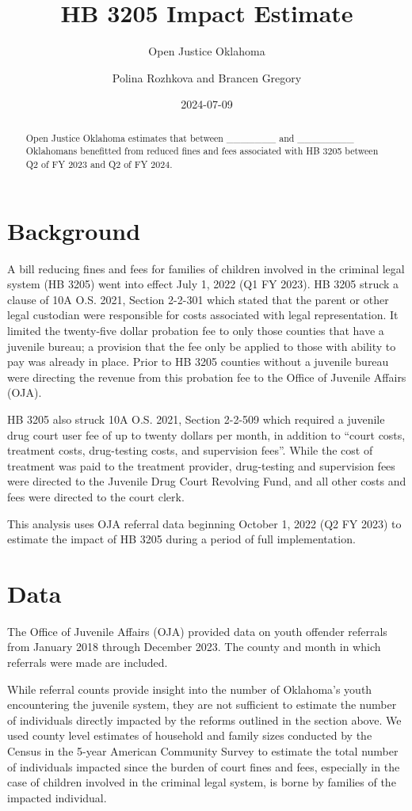 \documentclass[
  letterpaper,
  DIV=11,
  numbers=noendperiod]{scrartcl}
\title{HB 3205 Impact Estimate}
\subtitle{Open Justice Oklahoma}
\author{Polina Rozhkova and Brancen Gregory}
\date{2024-07-09}
\begin{document}
\maketitle
\begin{abstract}
Open Justice Oklahoma estimates that between \_\_\_\_\_\_\_ and
\_\_\_\_\_\_\_\_ Oklahomans benefitted from reduced fines and fees
associated with HB 3205 between Q2 of FY 2023 and Q2 of FY 2024.
\end{abstract}


\section{Background}\label{background}

A bill reducing fines and fees for families of children involved in the
criminal legal system (HB 3205) went into effect July 1, 2022 (Q1 FY
2023). HB 3205 struck a clause of 10A O.S. 2021, Section 2-2-301 which
stated that the parent or other legal custodian were responsible for
costs associated with legal representation. It limited the twenty-five
dollar probation fee to only those counties that have a juvenile bureau;
a provision that the fee only be applied to those with ability to pay
was already in place. Prior to HB 3205 counties without a juvenile
bureau were directing the revenue from this probation fee to the Office
of Juvenile Affairs (OJA).

HB 3205 also struck 10A O.S. 2021, Section 2-2-509 which required a
juvenile drug court user fee of up to twenty dollars per month, in
addition to ``court costs, treatment costs, drug-testing costs, and
supervision fees''. While the cost of treatment was paid to the
treatment provider, drug-testing and supervision fees were directed to
the Juvenile Drug Court Revolving Fund, and all other costs and fees
were directed to the court clerk.

This analysis uses OJA referral data beginning October 1, 2022 (Q2 FY
2023) to estimate the impact of HB 3205 during a period of full
implementation.

\section{Data}\label{data}

The Office of Juvenile Affairs (OJA) provided data on youth offender
referrals from January 2018 through December 2023. The county and month
in which referrals were made are included.

While referral counts provide insight into the number of Oklahoma's
youth encountering the juvenile system, they are not sufficient to
estimate the number of individuals directly impacted by the reforms
outlined in the section above. We used county level estimates of
household and family sizes conducted by the Census in the 5-year
American Community Survey to estimate the total number of individuals
impacted since the burden of court fines and fees, especially in the
case of children involved in the criminal legal system, is borne by
families of the impacted individual.
\end{document}
